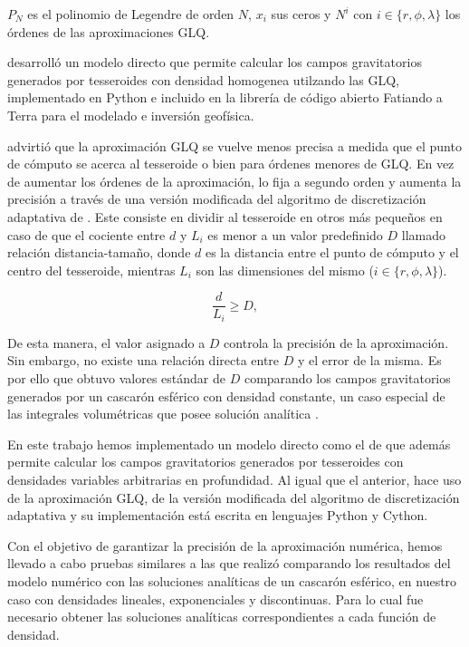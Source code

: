 \documentclass[a4paper,10pt]{article}
\begin{document}
\noindent $P_N$ es el polinomio de Legendre de orden $N$, $x_i$ sus ceros y $N^i$ con $i \in \{ r, \phi, \lambda\}$ los órdenes de las aproximaciones GLQ.

\citet{Uieda2016} desarrolló un modelo directo que permite calcular los campos gravitatorios generados por tesseroides con densidad homogenea utilzando las GLQ, implementado en Python e incluido en la librería de código abierto Fatiando a Terra \citep{Uieda2013} para el modelado e inversión geofísica.

\citet{Ku1977} advirtió que la aproximación GLQ se vuelve menos precisa a medida que el punto de cómputo se acerca al tesseroide o bien para órdenes menores de GLQ.
En vez de aumentar los órdenes de la aproximación, \citet{Uieda2016} lo fija a segundo orden y aumenta la precisión a través de una versión modificada del algoritmo de discretización adaptativa de \citet{Li2011}.
Este consiste en dividir al tesseroide en otros más pequeños en caso de que el cociente entre $d$ y $L_i$ es menor a un valor predefinido $D$ llamado relación distancia-tamaño, donde $d$ es la distancia entre el punto de cómputo y el centro del tesseroide, mientras $L_i$ son las dimensiones del mismo ($i \in \{ r, \phi, \lambda\}$).

\begin{equation}
    \frac{d}{L_i} \geq D,
\label{eq:distance-size-ratio}
\end{equation}

De esta manera, el valor asignado a $D$ controla la precisión de la aproximación.
Sin embargo, no existe una relación directa entre $D$ y el error de la misma.
Es por ello que \citet{Uieda2016} obtuvo valores estándar de $D$ comparando los campos gravitatorios generados por un cascarón esférico con densidad constante, un caso especial de las integrales volumétricas que posee solución analítica \citep{LaFehr1991, Mikuska2006, Grombein2013}.

En este trabajo hemos implementado un modelo directo como el de \citet{Uieda2016} que además permite calcular los campos gravitatorios generados por tesseroides con densidades variables arbitrarias en profundidad.
Al igual que el anterior, hace uso de la aproximación GLQ, de la versión modificada del algoritmo de discretización adaptativa y su implementación está escrita en lenguajes Python y Cython.

Con el objetivo de garantizar la precisión de la aproximación numérica, hemos llevado a cabo pruebas similares a las que realizó \citet{Uieda2016} comparando los resultados del modelo numérico con las soluciones analíticas de un cascarón esférico, en nuestro caso con densidades lineales, exponenciales y discontinuas.
Para lo cual fue necesario obtener las soluciones analíticas correspondientes a cada función de densidad.





\end{document}
